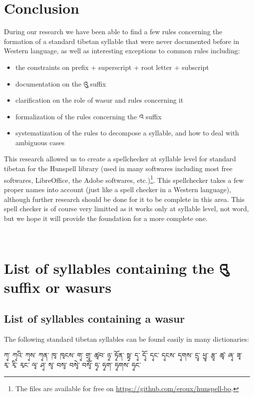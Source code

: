 \documentclass[%
a4paper,%
pagesize,%
12pt,%
parskip=off,%
bibliography=totoc,%
numbers=noenddot,%
DIV=12,%
twoside=semi,%
headings=normal%
]{scrartcl}
\begin{document}
\section{Conclusion}

During our research we have been able to find a few rules concerning the formation of a standard tibetan syllable that were never documented before in Western language, as well as interesting exceptions to common rules including:

\begin{itemize}
\item the constraints on prefix + superscript + root letter + subscript
\item documentation on the འུ suffix
\item clarification on the role of wasur and rules concerning it
\item formalization of the rules concerning the འ suffix
\item systematization of the rules to decompose a syllable, and how to deal with ambiguous cases
\end{itemize}

This research allowed us to create a spellchecker at syllable level for standard tibetan for the Hunspell library (used in many softwares including most free softwares, LibreOffice, the Adobe softwares, etc.)\footnote{The files are available for free on \url{https://github.com/eroux/hunspell-bo}.}. This spellchecker takes a few proper names into account (just like a spell checker in a Western language), although further research should be done for it to be complete in this area. This spell checker is of course very limitted as it works only at syllable level, not word, but we hope it will provide the foundation for a more complete one.

­\appendix

\section{List of syllables containing the འུ suffix or wasurs}

\subsection{List of syllables containing a wasur}

The following standard tibetan syllables can be found easily in many dictionaries:

ཀྭ་ ཀྭའི་ ཀྭས་ ཀྭན་ ཁྭ་ ཁྭངས་ གྭ་ གྲྭ་ ཚྭབ་ ཉྭ་ ཏྭོན་ སྟྭ་ དྭ་ དྭོ་ དྭང་ དྭངས་ དྭགས་ དྲྭ་ ཕྱྭ་ རྩྭ་ ཚྭ་ ཞྭ་ ཟྭ་ རྭ་ རྭི་ རྭང་ ལྭ་ ཤྭ་ སྭ་ བསྭ་ བསྭེ་ བསྭོ་ ཧྭ་ ཧྭག་ ཧྭགས་ ཧྭང་ 
\end{document}
